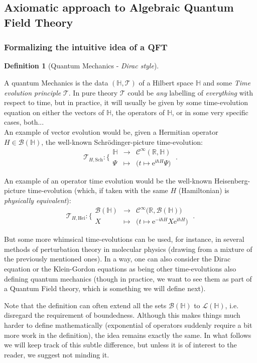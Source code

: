 \documentclass[a4paper,11pt]{article}
\numberwithin{equation}{section}
\theoremstyle{definition}
\newtheorem{definition}{Definition}
\newcommand{\e}{{\mathrm{e}}}
\begin{document}
\subsection{Axiomatic approach to Algebraic Quantum Field Theory}
\subsubsection{Formalizing the intuitive idea of a QFT}
\begin{definition}[Quantum Mechanics - \emph{Dirac style}]$\quad$

A quantum Mechanics is the data $(\mathbb{H},\mathcal{T})$ of a Hilbert space $\mathbb{H}$ and some \emph{Time evolution principle} $\mathcal{T}$. In pure theory $\mathcal{T}$ could be \emph{any} labelling of \emph{everything} with respect to time, but in practice, it will usually be given by some time-evolution equation on either the vectors of $\mathbb{H}$, the operators of $\mathbb{H}$, or in some very specific cases, both...\\
An example of vector evolution would be, given a Hermitian operator $H\in\mathcal{B}(\mathbb{H})$, the well-known Schrödinger-picture time-evolution:
$$\boxed{\mathcal{T}_{H,\mathrm{Sch}}: \Bigg\{
\begin{matrix}
\mathbb{H} & \to & \mathcal{C}^\infty(\mathbb{R},\mathbb{H})\\
\Psi & \mapsto & \Big(t\mapsto \e^{\mathfrak{i}\hbar H}\Psi\Big)
\end{matrix}}\;.$$

An example of an operator time evolution would be the well-known Heisenberg-picture time-evolution (which, if taken with the same $H$ (Hamiltonian) is \emph{physically equivalent}):
$$\boxed{\mathcal{T}_{H,\mathrm{Hei}}: \Bigg\{
\begin{matrix}
\mathcal{B}(\mathbb{H}) & \to & \mathcal{C}^\infty\big(\mathbb{R},\mathcal{B}(\mathbb{H})\big)\\
X & \mapsto & \Big(t\mapsto \e^{-\mathfrak{i}\hbar H}X\e^{\mathfrak{i}\hbar H}\Big)
\end{matrix}}\;.$$

But some more whimsical time-evolutions can be used, for instance, in several methods of perturbation theory in molecular physics (drawing from a mixture of the previously mentioned ones). In a way, one can also consider the Dirac equation or the Klein-Gordon equations as being other time-evolutions also defining quantum mechanics (though in practice, we want to see them as part of a Quantum Field theory, which is something we will define next).

Note that the definition can often extend all the sets $\mathcal{B}(\mathbb{H})$ to $\mathcal{L}(\mathbb{H})$, i.e. disregard the requirement of boundedness. Although this makes things much harder to define mathematically (exponential of operators suddenly require a bit more work in the definition), the idea remains exactly the same. In what follows we will keep track of this subtle difference, but unless it is of interest to the reader, we suggest not minding it.
\end{definition}
\end{document}
